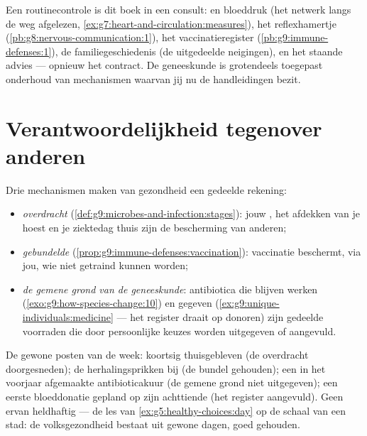 \begin{example}\label{ex:g9:our-responsibility:checkup}
Een routinecontrole is dit boek in een consult:  en bloeddruk (het
netwerk langs de weg afgelezen,
\cref{ex:g7:heart-and-circulation:measures}), het reflexhamertje
(\cref{pb:g8:nervous-communication:1}), het vaccinatieregister
(\cref{pb:g9:immune-defenses:1}), de familiegeschiedenis (de
uitgedeelde neigingen), en het staande advies --- opnieuw het
contract. De geneeskunde is grotendeels toegepast onderhoud van
mechanismen waarvan jij nu de handleidingen bezit.
\end{example}

\section{Verantwoordelijkheid tegenover anderen}

\begin{proposition}\label{prop:g9:our-responsibility:others}
Drie mechanismen maken van gezondheid een gedeelde rekening:
\begin{itemize}
  \item \emph{overdracht}
        (\cref{def:g9:microbes-and-infection:stages}): jouw
        , het afdekken van je hoest en je ziektedag thuis
        zijn de bescherming van anderen;
  \item \emph{gebundelde }
        (\cref{prop:g9:immune-defenses:vaccination}): vaccinatie
        beschermt, via jou, wie niet getraind kunnen worden;
  \item \emph{de gemene grond van de geneeskunde}: antibiotica die
        blijven werken (\cref{exo:g9:how-species-change:10}) en
        gegeven  (\cref{ex:g9:unique-individuals:medicine}
        --- het register draait op donoren) zijn gedeelde
        voorraden die door persoonlijke keuzes worden uitgegeven
        of aangevuld.
\end{itemize}
\end{proposition}
\admitted

\begin{example}\label{ex:g9:our-responsibility:account}
De gewone posten van de week: koortsig thuisgebleven (de overdracht
doorgesneden); de herhalingsprikken bij (de bundel gehouden); een
in het voorjaar afgemaakte antibioticakuur (de gemene grond niet
uitgegeven); een eerste bloeddonatie gepland op zijn achttiende
(het register aangevuld). Geen ervan heldhaftig --- de les van
\cref{ex:g5:healthy-choices:day} op de schaal van een stad: de
volksgezondheid bestaat uit gewone dagen, goed gehouden.
\end{example}


